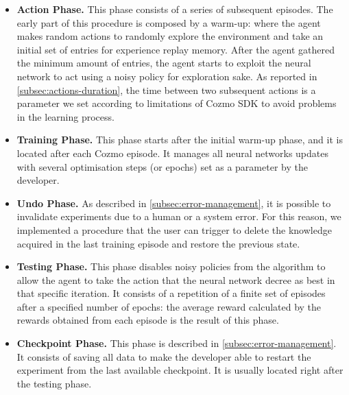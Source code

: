 \begin{itemize}
 \item \textbf{Action Phase.} This phase consists of a series of subsequent episodes. The early part of this procedure is composed by a warm-up: where the agent makes random actions to randomly explore the environment and take an initial set of entries for experience replay memory. After the agent gathered the minimum amount of entries, the agent starts to exploit the neural network to act using a noisy policy for exploration sake. As reported in \vref{subsec:actions-duration}, the time between two subsequent actions is a parameter we set according to limitations of Cozmo SDK to avoid problems in the learning process.
 \item \textbf{Training Phase.} This phase starts after the initial warm-up phase, and it is located after each Cozmo episode. It manages all neural networks updates with several optimisation steps (or epochs) set as a parameter by the developer.
 \item \textbf{Undo Phase.} As described in \vref{subsec:error-management}, it is possible to invalidate experiments due to a human or a system error. For this reason, we implemented a procedure that the user can trigger to delete the knowledge acquired in the last training episode and restore the previous state.
 \item \textbf{Testing Phase.} This phase disables noisy policies from the algorithm to allow the agent to take the action that the neural network decree as best in that specific iteration. It consists of a repetition of a finite set of episodes after a specified number of epochs: the average reward calculated by the rewards obtained from each episode is the result of this phase. 
 \item \textbf{Checkpoint Phase.} This phase is described in \vref{subsec:error-management}. It consists of saving all data to make the developer able to restart the experiment from the last available checkpoint. It is usually located right after the testing phase.
\end{itemize}

